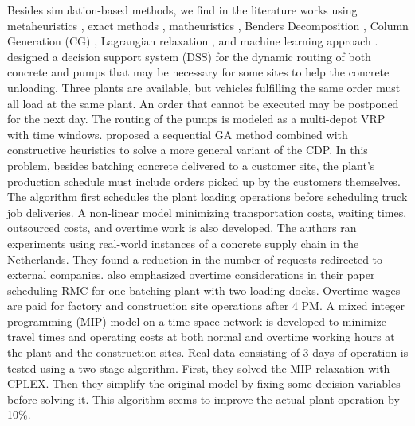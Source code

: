 \documentclass{article}
\begin{document}
{Besides simulation-based methods, we find in the literature works using metaheuristics \citep{faria2006distributed, misir2011selection, maghrebi2016sequential, yang2022concrete}, exact methods \citep{yan2007optimal, kinable2014concrete}, matheuristics \citep{schmid2009hybrid, schmid2010hybridization}, Benders Decomposition \citep{maghrebi2014benders}, Column Generation (CG) \citep{maghrebi2014solving, maghrebi2016column}, Lagrangian relaxation \citep{narayanan2015using}, and machine learning approach \citep{graham2006modeling, maghrebi2014exploring, maghrebi2016matching}.
\cite{matsatsinis2004towards} designed a decision support system (DSS) for the dynamic routing of both concrete and pumps that may be necessary for some sites to help the concrete unloading. Three plants are available, but vehicles fulfilling the same order must all load at the same plant. An order that cannot be executed may be postponed for the next day. The routing of the pumps is modeled as a multi-depot VRP with time windows. \cite{naso2007genetic} proposed a sequential GA method combined with constructive heuristics to solve a more general variant of the CDP. In this problem, besides batching concrete delivered to a customer site, the plant's production schedule must include orders picked up by the customers themselves. The algorithm first schedules the plant loading operations before scheduling truck job deliveries. A non-linear model minimizing transportation costs, waiting times, outsourced costs, and overtime work is also developed. The authors ran experiments using real-world instances of a concrete supply chain in the Netherlands. They found a reduction in the number of requests redirected to external companies. \cite{yan2007optimal} also emphasized overtime considerations in their paper scheduling RMC for one batching plant with two loading docks. Overtime wages are paid for factory and construction site operations after 4 PM. A mixed integer programming (MIP) model on a time-space network is developed to minimize travel times and operating costs at both normal and overtime working hours at the plant and the construction sites. Real data consisting of 3 days of operation is tested using a two-stage algorithm. First, they solved the MIP relaxation with CPLEX. Then they simplify the original model by fixing some decision variables before solving it. This algorithm seems to improve the actual plant operation by 10\%.
}
\end{document}
